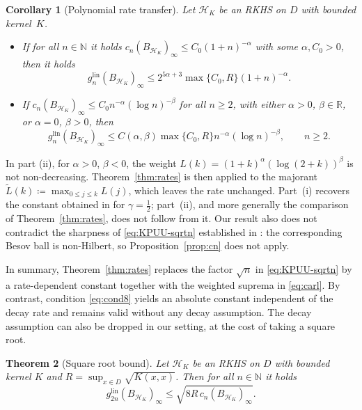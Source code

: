 \documentclass[11pt,reqno, a4paper]{article}
\numberwithin{equation}{section}
\newtheorem{theorem}{Theorem}[section]
\newtheorem{corollary}[theorem]{Corollary}
\newcommand{\N}{\mathbb{N}}
\newcommand{\R}{\mathbb{R}}
\newcommand{\lin}{\ensuremath{\mathrm{lin}}}
\begin{document}
\begin{corollary}[Polynomial rate transfer]\label{cor:rates}
    Let $\mathcal H_K$ be an RKHS on $D$ with bounded kernel~$K$.
    \begin{itemize}
    \item[(i)]
    If for all $n\in\N$ it holds $c_n(B_{\mathcal H_K})_\infty  \le C_0(1+n)^{-\alpha}$ with some $\alpha, C_0 >0$, then it holds
    \begin{equation}
        g_{n}^{\lin}(B_{\mathcal H_K})_\infty  \le 2^{5\alpha+3}\max\{C_0,R\} (1+n)^{-\alpha}.
    \end{equation}

    \item[(ii)] If $c_n(B_{\mathcal H_K})_\infty \le C_0 n^{-\alpha}(\log n)^{-\beta}$ for all $n\ge2$, with either $\alpha>0$, $\beta\in\R$, or $\alpha=0$, $\beta>0$, then
    \begin{equation}
        g_n^{\lin}(B_{\mathcal H_K})_\infty \le C(\alpha,\beta)\max\{C_0,R\}
        n^{-\alpha}(\log n)^{-\beta}, \qquad n\geq 2.
    \end{equation}
\end{itemize}
\end{corollary}
In part (ii), for $\alpha>0$, $\beta<0$, the weight $L(k)=(1+k)^{\alpha}(\log(2+k))^{\beta}$ is not non-decreasing.
Theorem~\ref{thm:rates} is then applied to the majorant $\widetilde L(k)\coloneqq\max_{0\le j\le k}L(j)$, which leaves the rate unchanged.
Part~(i) recovers the constant obtained in
\cite[Cor.~3.3(ii)]{DPW13} for $\gamma=\tfrac12$; part~(ii), and more generally the comparison of Theorem~\ref{thm:rates}, does not follow from it.
Our result also does not contradict the sharpness of \eqref{eq:KPUU-sqrtn} established in \cite[Sec.~5.3]{KPUU24}:
the corresponding Besov ball is non-Hilbert, so Proposition~\ref{prop:cn} does not apply.

In summary, Theorem~\ref{thm:rates} replaces the factor $\sqrt n$ in \eqref{eq:KPUU-sqrtn} by a rate-dependent constant together with the weighted suprema in \eqref{eq:carl}.
By contrast, condition \eqref{eq:cond8} yields an absolute constant independent of the decay rate and remains valid without any decay assumption.
The decay assumption can also be dropped in our setting, at the cost of taking a square root.
 
\begin{theorem}[Square root bound]\label{thm:geom}
Let $\mathcal H_K  $ be an RKHS on $D$ with bounded kernel $K$ and $R = \sup_{x\in D}\sqrt{K(x,x)}$. Then for all $n\in\N$ it holds
\begin{equation}
g_{2n}^{\lin}(B_{\mathcal H_K})_\infty  \le \sqrt{8R \, c_n(B_{\mathcal H_K})_\infty}.
\end{equation}
\end{theorem}
\end{document}
